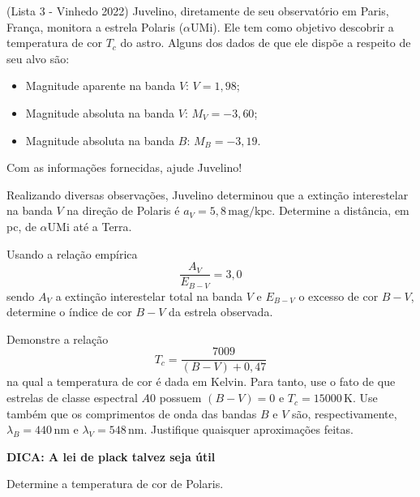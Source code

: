 \documentclass[11pt]{article}
\begin{document}
\begin{pproblem}(Lista 3 - Vinhedo 2022)
Juvelino, diretamente de seu observatório em Paris, França, monitora a estrela Polaris ($\alpha\text{UMi}$). Ele tem como objetivo descobrir a temperatura de cor $T_c$ do astro. Alguns dos dados de que ele dispõe a respeito de seu alvo são:

\begin{itemize}
    \item Magnitude aparente na banda $V$: $V = 1,98$;
    \item Magnitude absoluta na banda $V$: $M_V = -3,60$;
    \item Magnitude absoluta na banda $B$: $M_B = -3,19$.
\end{itemize}

Com as informações fornecidas, ajude Juvelino!

\begin{alternativas}
    \item Realizando diversas observações, Juvelino determinou que a extinção interestelar na banda $V$ na direção de Polaris é $a_V = 5,8 \, \text{mag/kpc}$. Determine a distância, em pc, de $\alpha\text{UMi}$ até a Terra.
    \item Usando a relação empírica
    \begin{equation}
        \frac{A_V}{E_{B-V}} = 3,0
    \end{equation}
    sendo $A_V$ a extinção interestelar total na banda $V$ e $E_{B-V}$ o excesso de cor $B-V$, determine o índice de cor $B-V$ da estrela observada.
    \item Demonstre a relação
    \begin{equation}
        T_c = \frac{7009}{(B-V) + 0,47}
    \end{equation}
    na qual a temperatura de cor é dada em Kelvin. Para tanto, use o fato de que estrelas de classe espectral $A0$ possuem $(B-V) = 0$ e $T_c = 15000 \, \text{K}$. Use também que os comprimentos de onda das bandas $B$ e $V$ são, respectivamente, $\lambda_B = 440 \, \text{nm}$ e $\lambda_V = 548 \, \text{nm}$. Justifique quaisquer aproximações feitas.

    \textbf{DICA: A lei de plack talvez seja útil}
    \item Determine a temperatura de cor de Polaris.
\end{alternativas}
\end{pproblem}
\end{document}
